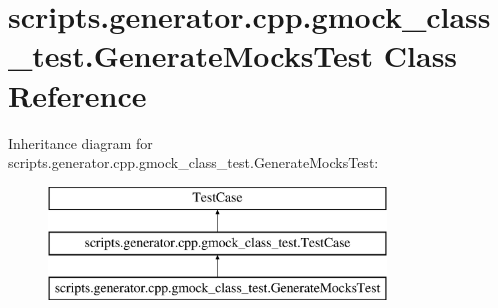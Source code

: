 \hypertarget{classscripts_1_1generator_1_1cpp_1_1gmock__class__test_1_1_generate_mocks_test}{}\section{scripts.\+generator.\+cpp.\+gmock\+\_\+class\+\_\+test.\+Generate\+Mocks\+Test Class Reference}
\label{classscripts_1_1generator_1_1cpp_1_1gmock__class__test_1_1_generate_mocks_test}
Inheritance diagram for scripts.\+generator.\+cpp.\+gmock\+\_\+class\+\_\+test.\+Generate\+Mocks\+Test\+:\begin{figure}[H]
\begin{center}
\leavevmode
\includegraphics[height=3.000000cm]{d6/de8/classscripts_1_1generator_1_1cpp_1_1gmock__class__test_1_1_generate_mocks_test}
\end{center}
\end{figure}
